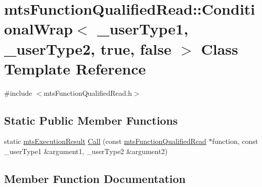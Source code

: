 \hypertarget{classmts_function_qualified_read_1_1_conditional_wrap_3_01__user_type1_00_01__user_type2_00_01true_00_01false_01_4}{}\section{mts\+Function\+Qualified\+Read\+:\+:Conditional\+Wrap$<$ \+\_\+user\+Type1, \+\_\+user\+Type2, true, false $>$ Class Template Reference}
\label{classmts_function_qualified_read_1_1_conditional_wrap_3_01__user_type1_00_01__user_type2_00_01true_00_01false_01_4}


{\ttfamily \#include $<$mts\+Function\+Qualified\+Read.\+h$>$}

\subsection*{Static Public Member Functions}
\begin{DoxyCompactItemize}
\item 
static \hyperlink{classmts_execution_result}{mts\+Execution\+Result} \hyperlink{classmts_function_qualified_read_1_1_conditional_wrap_3_01__user_type1_00_01__user_type2_00_01true_00_01false_01_4_a22a1022660032d8f2af13159adc3697d}{Call} (const \hyperlink{classmts_function_qualified_read}{mts\+Function\+Qualified\+Read} $\ast$function, const \+\_\+user\+Type1 \&argument1, \+\_\+user\+Type2 \&argument2)
\end{DoxyCompactItemize}


\subsection{Member Function Documentation}
\hypertarget{classmts_function_qualified_read_1_1_conditional_wrap_3_01__user_type1_00_01__user_type2_00_01true_00_01false_01_4_a22a1022660032d8f2af13159adc3697d}{}
